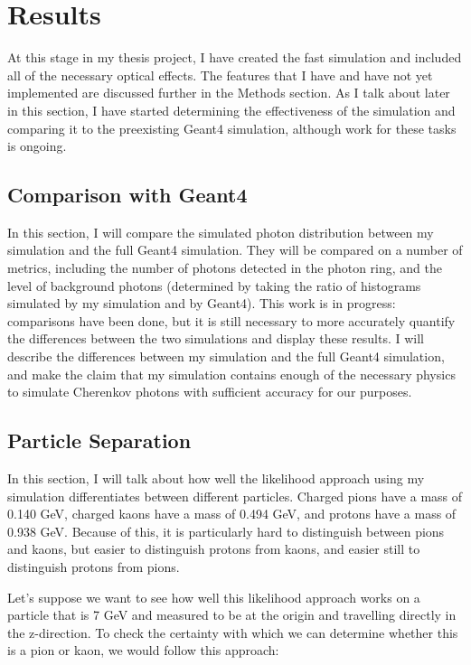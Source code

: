 
\chapter{Results}
\label{ch:Results}
At this stage in my thesis project, I have created the fast simulation and included all of the necessary optical effects. The features that I have and have not yet implemented are discussed further in the Methods section. As I talk about later in this section, I have started determining the effectiveness of the simulation and comparing it to the preexisting Geant4 simulation, although work for these tasks is ongoing.

\section{Comparison with Geant4} 
In this section, I will compare the simulated photon distribution between my simulation and the full Geant4 simulation.
They will be compared on a number of metrics, including the number of photons detected in the photon ring, and the level of background photons (determined by taking the ratio of histograms simulated by my simulation and by Geant4). This work is in progress: comparisons have been done, but it is still necessary to more accurately quantify the differences between the two simulations and display these results. I will describe the differences between my simulation and the full Geant4 simulation, and make the claim that my simulation contains enough of the necessary physics to simulate Cherenkov photons with sufficient accuracy for our purposes.

\section{Particle Separation}
In this section, I will talk about how well the likelihood approach using my simulation differentiates between different particles. 
Charged pions have a mass of  0.140 GeV, charged kaons have a mass of 0.494 GeV, and protons have a mass of 0.938 GeV.
Because of this, it is particularly hard to distinguish between pions and kaons, but easier to distinguish protons from kaons, and easier still to distinguish protons from pions.

Let's suppose we want to see how well this likelihood approach works on a particle that is 7 GeV and measured to be at the origin and travelling directly in the z-direction.
To check the certainty with which we can determine whether this is a pion or kaon, we would follow this approach:

